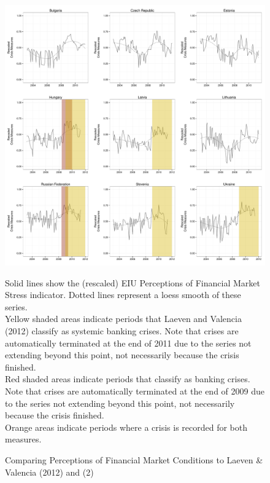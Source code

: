 \documentclass[]{article}
\begin{document}
\begin{figure}
    \caption{Comparing Perceptions of Financial Market Conditions to Laeven \& Valencia (2012) and \cite{Reinhart2009} (2)}
    \label{compare_2}
    \begin{center}
        \includegraphics[scale=0.4]{analysis/figures/compare_to_lv_rr_2.pdf}
    \end{center}

    {\tiny{Solid lines show the (rescaled) EIU Perceptions of Financial Market Stress indicator. Dotted lines represent a loess smooth of these series. \\

    Yellow shaded areas indicate periods that Laeven and Valencia (2012) classify as systemic banking crises. Note that crises are automatically terminated at the end of 2011 due to the series not extending beyond this point, not necessarily because the crisis finished. \\

    Red shaded areas indicate periods that \cite{Reinhart2009} classify as banking crises. Note that crises are automatically terminated at the end of 2009 due to the series not extending beyond this point, not necessarily because the crisis finished. \\

    Orange areas indicate periods where a crisis is recorded for both measures.}}
\end{figure}
\end{document}
